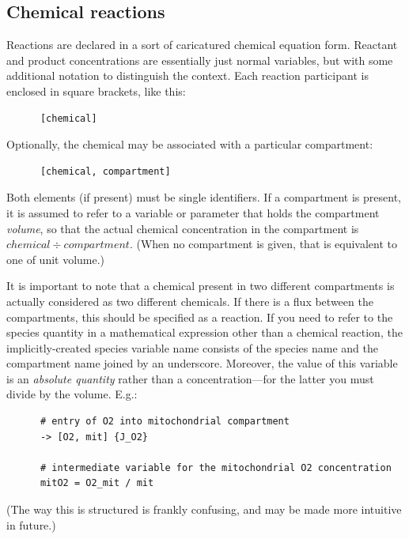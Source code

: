 \documentclass[a4paper,11pt]{article}
\begin{document}
\subsection{Chemical reactions}\label{chem}
Reactions are declared in a sort of caricatured chemical equation form. Reactant and product concentrations are essentially just normal variables, but with some additional notation to distinguish the context. Each reaction participant is enclosed in square brackets, like this:
\begin{verbatim}
      [chemical]
\end{verbatim}
Optionally, the chemical may be associated with a particular compartment:
\begin{verbatim}
      [chemical, compartment]
\end{verbatim}
Both elements (if present) must be single identifiers. If a compartment is present, it is assumed to refer to a variable or parameter that holds the compartment \textit{volume}, so that the actual chemical concentration in the compartment is $chemical \div compartment$. (When no compartment is given, that is equivalent to one of unit volume.)

It is important to note that a chemical present in two different compartments is actually considered as two different chemicals. If there is a flux between the compartments, this should be specified as a reaction. If you need to refer to the species quantity in a mathematical expression other than a chemical reaction, the implicitly-created species variable name consists of the species name and the compartment name joined by an underscore. Moreover, the value of this variable is an \textit{absolute quantity} rather than a concentration---for the latter you must divide by the volume. E.g.:
\begin{verbatim}
      # entry of O2 into mitochondrial compartment
      -> [O2, mit] {J_O2}
      
      # intermediate variable for the mitochondrial O2 concentration
      mitO2 = O2_mit / mit
\end{verbatim}
(The way this is structured is frankly confusing, and may be made more intuitive in future.)
\end{document}
